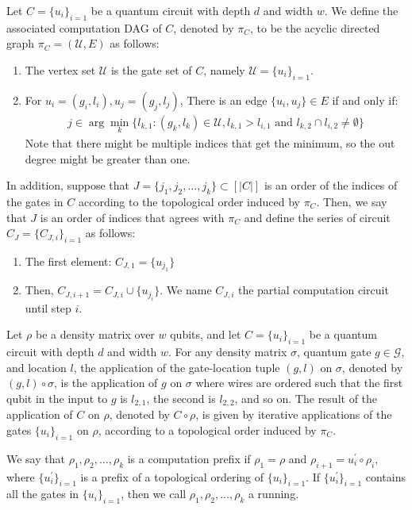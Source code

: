 \begin{definition}
  Let $C = \{u_{i}\}_{i=1}$ be a quantum circuit with depth $d$ and width $w$. We define the associated computation DAG of $C$, denoted by $\pi_{C}$, to be the acyclic directed graph $\pi_{C} = (\mathcal{U}, E)$ as follows:
  \begin{enumerate}
    \item The vertex set $\mathcal{U}$ is the gate set of $C$, namely $\mathcal{U} = \{u_{i}\}_{i=1}$.
    \item For $u_{i}= (g_{i},l_{i}), u_{j}= (g_{j},l_{j})$, There is an edge $\{u_{i},u_{j}\} \in E$ if and only if:
      \begin{equation*}
        \begin{split}
          j \in \arg \min_{k} \big\{ l_{k,1} : (g_{k},l_{k})\in \mathcal{U}, l_{k,1} > l_{i,1} \text{ and } l_{k,2}\cap l_{i,2} \neq \emptyset  \big\}
        \end{split}
      \end{equation*}
Note that there might be multiple indices that get the minimum, so the out degree might be greater than one.
  \end{enumerate}
  In addition, suppose that $J = \{ j_{1}, j_{2}, \ldots, j_{k} \} \subset [|C|]$ is an order of the indices of the gates in $C$ according to the topological order induced by $\pi_{C}$. Then, we say that $J$ is an order of indices that agrees with $\pi_{C}$ and define the series of circuit $C_{J} = \{ C_{J,i} \}_{i=1}$ as follows:
  \begin{enumerate}
    \item The first element: $C_{J,1} = \{ u_{j_{1}} \}$ 
    \item Then, $C_{J,i+1} = C_{J,i} \cup \{ u_{j_{i}} \}$. We name $C_{J,i}$ the partial computation circuit until step $i$.  
  \end{enumerate}
\end{definition}

\begin{definition}
  Let $\rho$ be a density matrix over $w$ qubits, and let $C = \{u_{i}\}_{i=1}$ be a quantum circuit with depth $d$ and width $w$. For any density matrix $\sigma$, quantum gate $g \in \mathcal{G}$, and location $l$, the application of the gate-location tuple $(g,l)$ on $\sigma$, denoted by $(g,l) \circ \sigma$, is the application of $g$ on $\sigma$ where wires are ordered such that the first qubit in the input to $g$ is $l_{2,1}$, the second is $l_{2,2}$, and so on. The result of the application of $C$ on $\rho$, denoted by $C \circ \rho$, is given by iterative applications of the gates $\{u_{i}\}_{i=1}$ on $\rho$, according to a topological order induced by $\pi_{C}$.

  We say that $\rho_{1}, \rho_{2}, \ldots, \rho_{k}$ is a computation prefix if $\rho_{1} = \rho$ and $\rho_{i+1} = u^\prime_{i} \circ \rho_{i}$, where $\{u^{\prime}_{i}\}_{i=1}$ is a prefix of a topological ordering of $\{u_{i}\}_{i=1}$. If $\{u^{\prime}_{i}\}_{i=1}$ contains all the gates in $\{u_{i}\}_{i=1}$, then we call $\rho_{1}, \rho_{2}, \ldots, \rho_{k}$ a running.
\end{definition}

